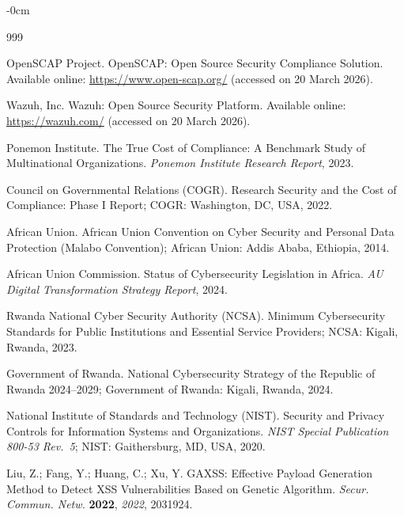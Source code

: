 \documentclass[futureinternet,article,submit,pdftex,moreauthors]{Definitions/mdpi}
\begin{document}

\begin{adjustwidth}{-\extralength}{0cm}


\begin{thebibliography}{999}

OpenSCAP Project. OpenSCAP: Open Source Security Compliance Solution. Available online:
\url{https://www.open-scap.org/} (accessed on 20 March 2026).

Wazuh, Inc. Wazuh: Open Source Security Platform. Available online:
\url{https://wazuh.com/} (accessed on 20 March 2026).

Ponemon Institute. The True Cost of Compliance: A Benchmark Study of Multinational
Organizations. \textit{Ponemon Institute Research Report}, 2023.

Council on Governmental Relations (COGR). Research Security and the Cost of Compliance:
Phase I Report; COGR: Washington, DC, USA, 2022.

African Union. African Union Convention on Cyber Security and Personal Data Protection
(Malabo Convention); African Union: Addis Ababa, Ethiopia, 2014.

African Union Commission. Status of Cybersecurity Legislation in Africa.
\textit{AU Digital Transformation Strategy Report}, 2024.

Rwanda National Cyber Security Authority (NCSA). Minimum Cybersecurity Standards for Public
Institutions and Essential Service Providers; NCSA: Kigali, Rwanda, 2023.

Government of Rwanda. National Cybersecurity Strategy of the Republic of Rwanda 2024--2029;
Government of Rwanda: Kigali, Rwanda, 2024.

National Institute of Standards and Technology (NIST). Security and Privacy Controls for
Information Systems and Organizations. \textit{NIST Special Publication 800-53 Rev.\ 5};
NIST: Gaithersburg, MD, USA, 2020.

Liu, Z.; Fang, Y.; Huang, C.; Xu, Y. GAXSS: Effective Payload Generation Method to Detect
XSS Vulnerabilities Based on Genetic Algorithm.
\textit{Secur. Commun. Netw.} \textbf{2022}, \textit{2022}, 2031924.


\end{thebibliography}
\end{adjustwidth}
\end{document}
